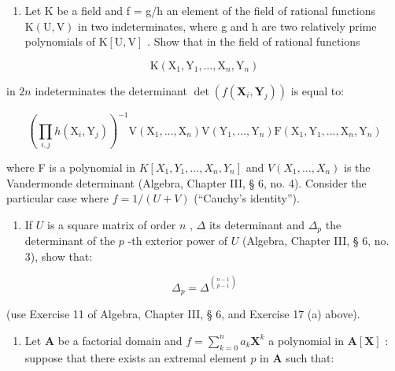 \begin{enumerate}
\def\labelenumi{\arabic{enumi}.}
\setcounter{enumi}{17}
\tightlist
\item
  Let K be a field and f = g/h an element of the field of rational functions \(\mathrm{K}(\mathrm{U}, \mathrm{V})\) in two indeterminates, where g and h are two relatively prime polynomials of \(\mathrm{K}[\mathrm{U}, \mathrm{V}]\) . Show that in the field of rational functions
\end{enumerate}

\[
\mathrm{K} \left(\mathrm{X} _ {1}, \mathrm{Y} _ {1}, \dots , \mathrm{X} _ {n}, \mathrm{Y} _ {n}\right)
\]

in \(2n\) indeterminates the determinant \(\operatorname{det}(f(\mathbf{X}_i, \mathbf{Y}_j))\) is equal to:

\[
\left(\prod_ {i, j} h \left(\mathrm{X} _ {i}, \mathrm{Y} _ {j}\right)\right) ^ {- 1} \mathrm{V} \left(\mathrm{X} _ {1}, \dots , \mathrm{X} _ {n}\right) \mathrm{V} \left(\mathrm{Y} _ {1}, \dots , \mathrm{Y} _ {n}\right) \mathrm{F} \left(\mathrm{X} _ {1}, \mathrm{Y} _ {1}, \dots , \mathrm{X} _ {n}, \mathrm{Y} _ {n}\right)
\]

where F is a polynomial in \(K[X_{1}, Y_{1}, \ldots, X_{n}, Y_{n}]\) and \(V(X_{1}, \ldots, X_{n})\) is the Vandermonde determinant (Algebra, Chapter III, § 6, no. 4). Consider the particular case where \(f = 1/(U + V)\) (``Cauchy's identity'').

\begin{enumerate}
\def\labelenumi{\arabic{enumi}.}
\setcounter{enumi}{18}
\tightlist
\item
  If \(U\) is a square matrix of order \(n\) , \(\Delta\) its determinant and \(\Delta_p\) the determinant of the \(p\) -th exterior power of \(U\) (Algebra, Chapter III, § 6, no. 3), show that:
\end{enumerate}

\[
\Delta_ {p} = \Delta^ {\binom {n - 1} {p - 1}}
\]

(use Exercise 11 of Algebra, Chapter III, § 6, and Exercise 17 (a) above).

\begin{enumerate}
\def\labelenumi{\arabic{enumi}.}
\setcounter{enumi}{19}
\tightlist
\item
  Let \(\mathbf{A}\) be a factorial domain and \(f = \sum_{k=0}^{n} a_k \mathbf{X}^k\) a polynomial in \(\mathbf{A}[\mathbf{X}]\) : suppose that there exists an extremal element \(p\) in \(\mathbf{A}\) such that:
\end{enumerate}


